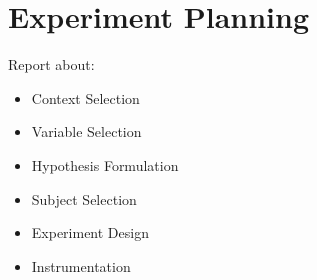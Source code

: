 \section{Experiment Planning}
Report about:
\begin{itemize}
	\item Context Selection
	\item Variable Selection
	\item Hypothesis Formulation
	\item Subject Selection
	\item Experiment Design
	\item Instrumentation
\end{itemize}


 